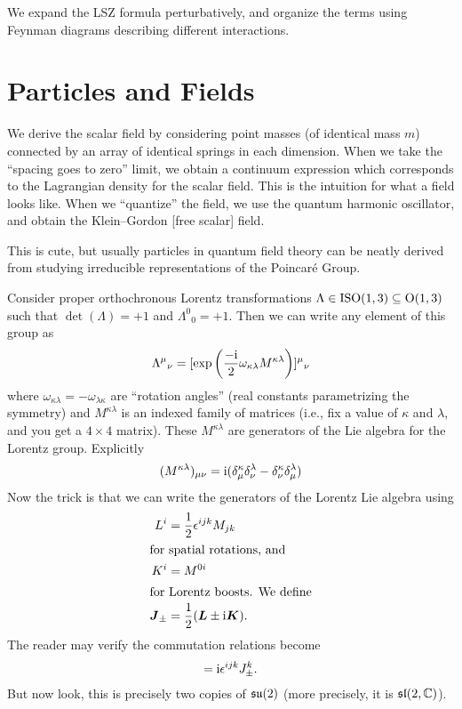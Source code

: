 We expand the LSZ formula perturbatively, and organize the terms using
Feynman diagrams describing different interactions.

\section{Particles and Fields}

We derive the scalar field by considering point masses (of identical
mass $m$) connected by an array of identical springs in each
dimension. When we take the ``spacing goes to zero'' limit, we obtain a
continuum expression which corresponds to the Lagrangian density for the
scalar field. This is the intuition for what a field looks like. When we
``quantize'' the field, we use the quantum harmonic oscillator, and
obtain the Klein--Gordon [free scalar] field.

This is cute, but usually particles in quantum field theory can be
neatly derived from studying irreducible representations of the Poincar\'{e} Group.

Consider proper orthochronous Lorentz transformations
$\Lambda\in\mathrm{ISO}(1,3)\subseteq\mathrm{O}(1,3)$ such that $\det(\Lambda)=+1$ and
${\Lambda^{0}}_{0}=+1$. Then we can write any element of this group as
\begin{equation}
{\Lambda^{\mu}}_{\nu} = [\exp\left(\frac{-\mathrm{i}}{2}\omega_{\kappa\lambda}M^{\kappa\lambda}\right)]{{}^{\mu}}_{\nu}
\end{equation}
where $\omega_{\kappa\lambda}=-\omega_{\lambda\kappa}$ are ``rotation
angles'' (real constants parametrizing the symmetry) and
$M^{\kappa\lambda}$ is an indexed family of matrices (i.e., fix a value
of $\kappa$ and $\lambda$, and you get a $4\times4$ matrix). These $M^{\kappa\lambda}$ are
generators of the Lie algebra for the Lorentz group. Explicitly
\begin{equation}
(M^{\kappa\lambda})_{\mu\nu} = \mathrm{i}(\delta^{\kappa}_{\mu}\delta^{\lambda}_{\nu}-\delta^{\kappa}_{\nu}\delta^{\lambda}_{\mu})
\end{equation}
Now the trick is that we can write the generators of the Lorentz Lie
algebra using
\begin{subequations}
\begin{align}
L^{i} &= \frac{1}{2}\epsilon^{ijk}M_{jk}\\
\intertext{for spatial rotations, and}
K^{i} &= M^{0i}\\
\intertext{for Lorentz boosts. We define}
\boldsymbol{J}_{\pm} &= \frac{1}{2}(\boldsymbol{L}\pm\mathrm{i}\boldsymbol{K}).
\end{align}
\end{subequations}
The reader may verify the commutation relations become
\begin{equation}
[J^{i}_{\pm}, J^{j}_{\pm}] = \I\epsilon^{ijk}J^{k}_{\pm}.
\end{equation}
But now look, this is precisely two copies of $\mathfrak{su}(2)$ (more precisely,
it is $\mathfrak{sl}(2,\mathbb{C})$).

